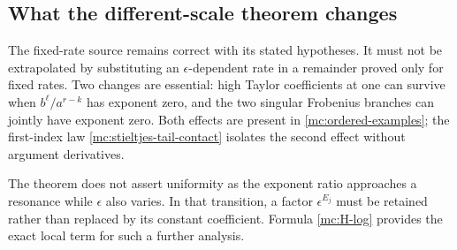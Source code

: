 \subsection{What the different-scale theorem changes}

The fixed-rate source remains correct with its stated hypotheses.
It must not be extrapolated by substituting an
$\epsilon$-dependent rate in a remainder proved only for fixed rates.
Two changes are essential: high Taylor coefficients at one can
survive when $b^\ell/a^{r-k}$ has exponent zero, and the two
singular Frobenius branches can jointly have exponent zero.
Both effects are present in \eqref{mc:ordered-examples}; the
first-index law \eqref{mc:stieltjes-tail-contact} isolates the
second effect without argument derivatives.

The theorem does not assert uniformity as the exponent ratio
approaches a resonance while $\epsilon$ also varies. In that
transition, a factor $\epsilon^{E_j}$ must be retained rather than
replaced by its constant coefficient. Formula \eqref{mc:H-log}
provides the exact local term for such a further analysis.
